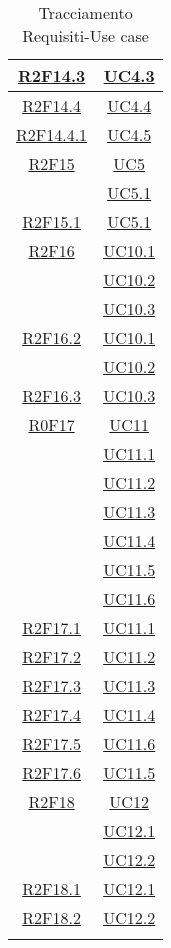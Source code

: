 \begin{longtable}{|c|c|}
\hline
\hyperlink{R2F14.3}{R2F14.3} & \hyperlink{UC4.3}{UC4.3}\\
\hline
\hyperlink{R2F14.4}{R2F14.4} & \hyperlink{UC4.4}{UC4.4}\\
\hline
\hyperlink{R2F14.4.1}{R2F14.4.1} & \hyperlink{UC4.5}{UC4.5}\\
\hline
\hyperlink{R2F15}{R2F15} & \hyperlink{UC5}{UC5}\\
& \hyperlink{UC5.1}{UC5.1}\\
\hline
\hyperlink{R2F15.1}{R2F15.1} & \hyperlink{UC5.1}{UC5.1}\\
\hline
\hyperlink{R2F16}{R2F16} & \hyperlink{UC10.1}{UC10.1}\\
& \hyperlink{UC10.2}{UC10.2}\\
& \hyperlink{UC10.3}{UC10.3}\\
\hline
\hyperlink{R2F16.2}{R2F16.2} & \hyperlink{UC10.1}{UC10.1}\\
& \hyperlink{UC10.2}{UC10.2}\\
\hline
\hyperlink{R2F16.3}{R2F16.3} & \hyperlink{UC10.3}{UC10.3}\\
\hline
\hyperlink{R0F17}{R0F17} & \hyperlink{UC11}{UC11}\\
& \hyperlink{UC11.1}{UC11.1}\\
& \hyperlink{UC11.2}{UC11.2}\\
& \hyperlink{UC11.3}{UC11.3}\\
& \hyperlink{UC11.4}{UC11.4}\\
& \hyperlink{UC11.5}{UC11.5}\\
& \hyperlink{UC11.6}{UC11.6}\\
\hline
\hyperlink{R2F17.1}{R2F17.1} & \hyperlink{UC11.1}{UC11.1}\\
\hline
\hyperlink{R2F17.2}{R2F17.2} & \hyperlink{UC11.2}{UC11.2}\\
\hline
\hyperlink{R2F17.3}{R2F17.3} & \hyperlink{UC11.3}{UC11.3}\\
\hline
\hyperlink{R2F17.4}{R2F17.4} & \hyperlink{UC11.4}{UC11.4}\\
\hline
\hyperlink{R2F17.5}{R2F17.5} & \hyperlink{UC11.6}{UC11.6}\\
\hline
\hyperlink{R2F17.6}{R2F17.6} & \hyperlink{UC11.5}{UC11.5}\\
\hline
\hyperlink{R2F18}{R2F18} & \hyperlink{UC12}{UC12}\\
& \hyperlink{UC12.1}{UC12.1}\\
& \hyperlink{UC12.2}{UC12.2}\\
\hline
\hyperlink{R2F18.1}{R2F18.1} & \hyperlink{UC12.1}{UC12.1}\\
\hline
\hyperlink{R2F18.2}{R2F18.2} & \hyperlink{UC12.2}{UC12.2}\\
\hline
\caption[Tracciamento Requisiti-Use case]{Tracciamento Requisiti-Use case}
\label{tabella:requi-usecase}
\end{longtable}

